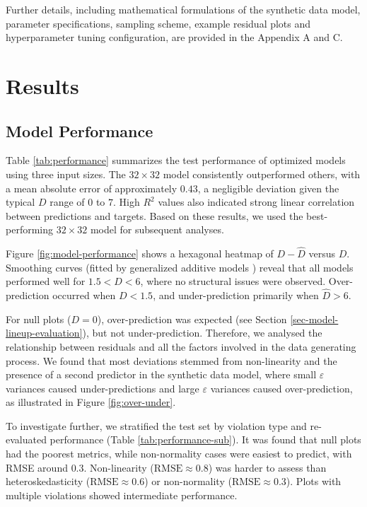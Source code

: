 \documentclass[]{interact}
\theoremstyle{plain}%
\theoremstyle{definition}
\theoremstyle{remark}
\begin{document}
Further details, including mathematical formulations of the synthetic
data model, parameter specifications, sampling scheme, example residual
plots and hyperparameter tuning configuration, are provided in the
Appendix A and C.

\section{Results}\label{sec-model-results}

\subsection{Model Performance}\label{model-performance}

Table \ref{tab:performance} summarizes the test performance of optimized
models using three input sizes. The \(32 \times 32\) model consistently
outperformed others, with a mean absolute error of approximately
\(0.43\), a negligible deviation given the typical \(D\) range of \(0\)
to \(7\). High \(R^2\) values also indicated strong linear correlation
between predictions and targets. Based on these results, we used the
best-performing \(32 \times 32\) model for subsequent analyses.

Figure \ref{fig:model-performance} shows a hexagonal heatmap of
\(D - \hat{D}\) versus \(D\). Smoothing curves (fitted by generalized
additive models \citep{hastie2017generalized}) reveal that all models
performed well for \(1.5 < D < 6\), where no structural issues were
observed. Over-prediction occurred when \(D < 1.5\), and
under-prediction primarily when \(\hat{D} > 6\).

For null plots (\(D = 0\)), over-prediction was expected (see Section
\ref{sec-model-lineup-evaluation}), but not under-prediction. Therefore,
we analysed the relationship between residuals and all the factors
involved in the data generating process. We found that most deviations
stemmed from non-linearity and the presence of a second predictor in the
synthetic data model, where small \(\varepsilon\) variances caused
under-predictions and large \(\varepsilon\) variances caused
over-prediction, as illustrated in Figure \ref{fig:over-under}.

To investigate further, we stratified the test set by violation type and
re-evaluated performance (Table \ref{tab:performance-sub}). It was found
that null plots had the poorest metrics, while non-normality cases were
easiest to predict, with RMSE around \(0.3\). Non-linearity
(\(\text{RMSE} \approx  0.8\)) was harder to assess than
heteroskedasticity (\(\text{RMSE} \approx  0.6\)) or non-normality
(\(\text{RMSE} \approx  0.3\)). Plots with multiple violations showed
intermediate performance.
\end{document}
